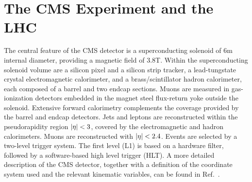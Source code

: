 \chapter{The CMS Experiment and the LHC}
\label{ch:cms}

The central feature of the CMS detector is a
superconducting solenoid of 6\unit{m} internal diameter, providing a
magnetic field of 3.8\unit{T}. Within the superconducting solenoid
volume are a silicon pixel and a silicon strip tracker, a
lead-tungstate crystal electromagnetic calorimeter, and a
brass/scintillator hadron calorimeter, each composed of a barrel and
two endcap sections. Muons are measured in gas-ionization detectors
embedded in the magnet steel flux-return yoke outside the
solenoid. Extensive forward calorimetry complements the coverage
provided by the barrel and endcap detectors. Jets and leptons are
reconstructed within the pseudorapidity region $\lvert \eta \rvert<3$, covered by the
electromagnetic and hadron calorimeters. Muons are reconstructed with
$\lvert \eta \rvert<2.4$. Events are selected by a
two-level trigger system. The first level (L1) is based on a hardware
filter, followed by a software-based high level trigger (HLT). A more
detailed description of the CMS detector, together with a definition
of the coordinate system used and the relevant kinematic variables,
can be found in Ref.~\cite{Adolphi:2008zzk}.

